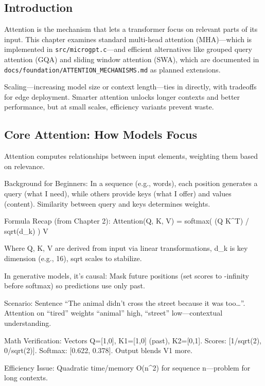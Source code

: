 \documentclass[
]{article}
\begin{document}
\subsection{Introduction}\label{introduction-7}

Attention is the mechanism that lets a transformer focus on relevant
parts of its input. This chapter examines standard multi-head attention
(MHA)---which is implemented in \texttt{src/microgpt.c}---and efficient
alternatives like grouped query attention (GQA) and sliding window
attention (SWA), which are documented in
\texttt{docs/foundation/ATTENTION\_MECHANISMS.md} as planned extensions.

Scaling---increasing model size or context length---ties in directly,
with tradeoffs for edge deployment. Smarter attention unlocks longer
contexts and better performance, but at small scales, efficiency
variants prevent waste.

\subsection{Core Attention: How Models
Focus}\label{core-attention-how-models-focus}

Attention computes relationships between input elements, weighting them
based on relevance.

Background for Beginners: In a sequence (e.g., words), each position
generates a query (what I need), while others provide keys (what I
offer) and values (content). Similarity between query and keys
determines weights.

Formula Recap (from Chapter 2): Attention(Q, K, V) = softmax( (Q K\^{}T)
/ sqrt(d\_k) ) V

Where Q, K, V are derived from input via linear transformations, d\_k is
key dimension (e.g., 16), sqrt scales to stabilize.

In generative models, it's causal: Mask future positions (set scores to
-infinity before softmax) so predictions use only past.

Scenario: Sentence ``The animal didn't cross the street because it was
too\ldots{}''. Attention on ``tired'' weights ``animal'' high,
``street'' low---contextual understanding.

Math Verification: Vectors Q={[}1,0{]}, K1={[}1,0{]} (past),
K2={[}0,1{]}. Scores: {[}1/sqrt(2), 0/sqrt(2){]}. Softmax: {[}0.622,
0.378{]}. Output blends V1 more.

Efficiency Issue: Quadratic time/memory O(n\^{}2) for sequence
n---problem for long contexts.
\end{document}
